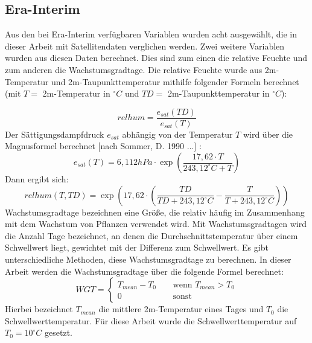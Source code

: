 \documentclass[]{article}
\begin{document}
\subsection{Era-Interim}
Aus den bei Era-Interim verfügbaren Variablen wurden acht ausgewählt, die in dieser Arbeit mit Satellitendaten verglichen werden. Zwei weitere Variablen wurden aus diesen Daten berechnet. Dies sind zum einen die relative Feuchte und zum anderen die Wachstumsgradtage. Die relative Feuchte wurde aus 2m-Temperatur und 2m-Taupunkttemperatur mithilfe folgender Formeln berechnet (mit $T=$ 2m-Temperatur in $^{\circ} C$ und $TD=$ 2m-Taupunkttemperatur in $^{\circ}C$):

\begin{equation}
relhum=\frac{e_{sat}(TD)}{e_{sat}(T)}
\end{equation}
Der Sättigungsdampfdruck $e_{sat}$ abhängig von der Temperatur $T$ wird über die Magnusformel berechnet [nach Sommer, D. 1990 ...] :
\begin{equation}
e_{sat}(T)=6,112hPa\cdot\exp\left(\frac{17,62 \cdot T}{243,12 ^{\circ}C + T}\right)
\end{equation}
Dann ergibt sich:
\begin{equation}
relhum(T,TD)=\exp\left(17,62\cdot\left(\frac{TD}{TD+243,12^{\circ}C}-\frac{T}{T+243,12^{\circ}C}\right)\right)
\end{equation}
Wachstumsgradtage bezeichnen eine Größe, die relativ häufig im Zusammenhang mit dem Wachstum von Pflanzen verwendet wird. Mit Wachstumsgradtagen wird die Anzahl Tage bezeichnet, an denen die Durchschnittstemperatur über einem
Schwellwert liegt, gewichtet mit der Differenz zum Schwellwert. Es gibt unterschiedliche Methoden, diese Wachstumsgradtage zu berechnen. In dieser Arbeit werden die Wachstumsgradtage über die folgende Formel berechnet:
\begin{equation}
WGT=\begin{cases}
T_{mean}-T_0 & \;\;\;\text{ wenn }  T_{mean}>T_0 \\
0 & \; \;\;\text{ sonst} 
\end{cases}
\end{equation}
Hierbei bezeichnet $T_{mean}$ die mittlere 2m-Temperatur eines Tages und $T_0$ die Schwellwerttemperatur. Für diese Arbeit wurde die Schwellwerttemperatur auf $T_0=10^\circ C$ gesetzt. \\
\end{document}

